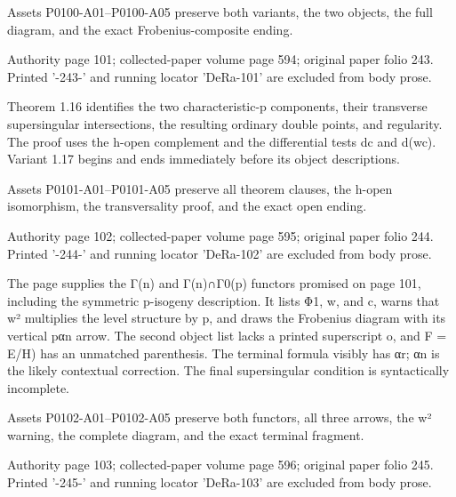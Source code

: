 \documentclass[11pt,a4paper]{article}
\begin{document}
Assets P0100-A01--P0100-A05 preserve both variants, the two objects, the full diagram, and the exact Frobenius-composite ending.


\par\medskip
\hypertarget{D018-P0101}{}
\par\smallskip
Authority page 101; collected-paper volume page 594; original paper folio 243. Printed '-243-' and running locator 'DeRa-101' are excluded from body prose.

Theorem 1.16 identifies the two characteristic-p components, their transverse supersingular intersections, the resulting ordinary double points, and regularity. The proof uses the h-open complement and the differential tests dc and d(wc). Variant 1.17 begins and ends immediately before its object descriptions.

Assets P0101-A01--P0101-A05 preserve all theorem clauses, the h-open isomorphism, the transversality proof, and the exact open ending.


\par\medskip
\hypertarget{D018-P0102}{}
\par\smallskip
Authority page 102; collected-paper volume page 595; original paper folio 244. Printed '-244-' and running locator 'DeRa-102' are excluded from body prose.

The page supplies the Γ(n) and Γ(n)∩Γ\textunderscore{}0(p) functors promised on page 101, including the symmetric p-isogeny description. It lists Φ\textunderscore{}1, w, and c, warns that w² multiplies the level structure by p, and draws the Frobenius diagram with its vertical pα\textunderscore{}n arrow. The second object list lacks a printed superscript o, and F = E/H) has an unmatched parenthesis. The terminal formula visibly has α\textunderscore{}r; α\textunderscore{}n is the likely contextual correction. The final supersingular condition is syntactically incomplete.

Assets P0102-A01--P0102-A05 preserve both functors, all three arrows, the w² warning, the complete diagram, and the exact terminal fragment.


\par\medskip
\hypertarget{D018-P0103}{}
\par\smallskip
Authority page 103; collected-paper volume page 596; original paper folio 245. Printed '-245-' and running locator 'DeRa-103' are excluded from body prose.
\end{document}
